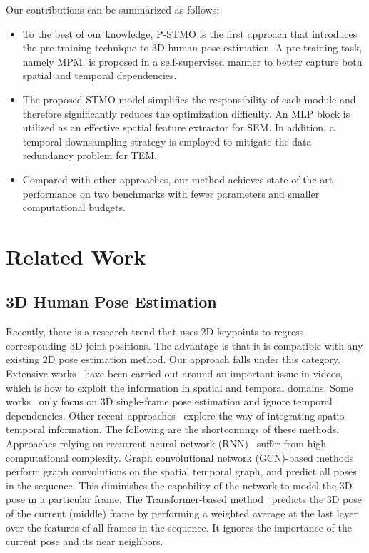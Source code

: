 \documentclass[]{llncs}
\begin{document}
Our contributions can be summarized as follows:
\begin{itemize}

\item To the best of our knowledge, P-STMO is the first approach that introduces the pre-training technique to 3D human pose estimation. A pre-training task, namely MPM, is proposed in a self-supervised manner to better capture both spatial and temporal dependencies.
\item The proposed STMO model simplifies the responsibility of each module and therefore significantly reduces the optimization difficulty. An MLP block is utilized as an effective spatial feature extractor for SEM. In addition, a temporal downsampling strategy is employed to mitigate the data redundancy problem for TEM.
\item Compared with other approaches, our method achieves state-of-the-art performance on two benchmarks with fewer parameters and smaller computational budgets.


\end{itemize}




\section{Related Work}

\subsection{3D Human Pose Estimation}
Recently, there is a research trend that uses 2D keypoints to regress corresponding 3D joint positions. The advantage is that it is compatible with any existing 2D pose estimation method. Our approach falls under this category. Extensive works~\cite{xu2020deep,wang2014robust,sun2017compositional,martinez2017simple,pavlakos2018ordinal,fang2018learning,mehta2017vnect} have been carried out around an important issue in videos, which is how to exploit the information in spatial and temporal domains. Some works~\cite{sun2017compositional,martinez2017simple,zeng2021learning,fang2018learning} only focus on 3D single-frame pose estimation and ignore temporal dependencies. Other recent approaches~\cite{xu2020deep,zheng20213d,wang2020motion,cai2019exploiting,hossain2018exploiting} explore the way of integrating spatio-temporal information. The following are the shortcomings of these methods. Approaches relying on recurrent neural network (RNN)~\cite{hossain2018exploiting,lee2018propagating} suffer from high computational complexity. Graph convolutional network (GCN)-based methods~\cite{wang2020motion,hu2021conditional} perform graph convolutions on the spatial temporal graph, and predict all poses in the sequence. This diminishes the capability of the network to model the 3D pose in a particular frame. The Transformer-based method~\cite{zheng20213d} predicts the 3D pose of the current (middle) frame by performing a weighted average at the last layer over the features of all frames in the sequence. It ignores the importance of the current pose and its near neighbors.
\end{document}
